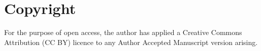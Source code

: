 \documentclass[acmtacm,screen]{acmart}
\begin{document}

\label{sec:approach}


\label{sec:implementation}


\label{sec:case_studies}


\label{sec:experiment}


\label{sec:automated_spl_reengineering}


\label{sec:related_work}


\label{sec:conclusion} 



\section{Copyright}

For the purpose of open access, the author has applied a Creative Commons Attribution (CC BY) licence to any Author Accepted Manuscript version arising.






\appendix
\end{document}
